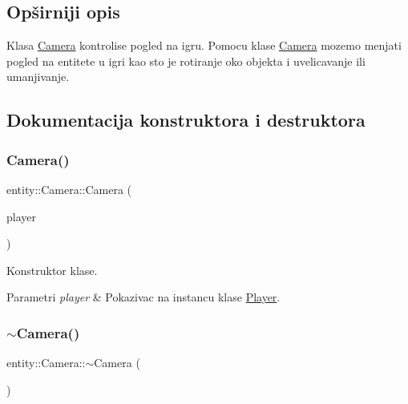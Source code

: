 \subsection{Opširniji opis}
Klasa \hyperlink{classentity_1_1Camera}{Camera} kontrolise pogled na igru. Pomocu klase \hyperlink{classentity_1_1Camera}{Camera} mozemo menjati pogled na entitete u igri kao sto je rotiranje oko objekta i uvelicavanje ili umanjivanje. 

\subsection{Dokumentacija konstruktora i destruktora}
\mbox{\label{classentity_1_1Camera_ae28b5312d87e147f8a6a6b3f76c1d0fa}} 
\subsubsection{\texorpdfstring{Camera()}{Camera()}}
{\footnotesize\ttfamily entity\+::\+Camera\+::\+Camera (\begin{DoxyParamCaption}\item[{\hyperlink{classentity_1_1Player}{Player} $\ast$}]{player }\end{DoxyParamCaption})}



Konstruktor klase. 


\begin{DoxyParams}{Parametri}
{\em player} & Pokazivac na instancu klase \hyperlink{classentity_1_1Player}{Player}. \\
\hline
\end{DoxyParams}
\mbox{\label{classentity_1_1Camera_ae161d83061be4f328de222570c3ece95}} 
\subsubsection{\texorpdfstring{$\sim$\+Camera()}{~Camera()}}
{\footnotesize\ttfamily entity\+::\+Camera\+::$\sim$\+Camera (\begin{DoxyParamCaption}{ }\end{DoxyParamCaption})}



